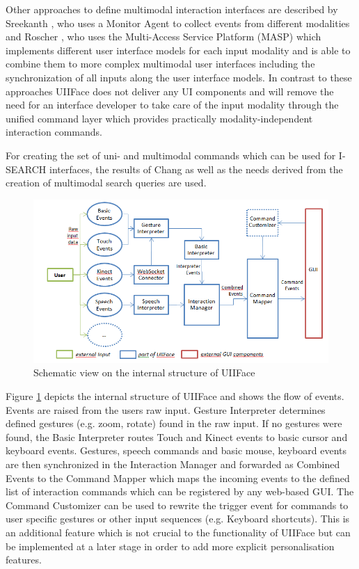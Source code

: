 \documentclass[runningheads,a4paper]{llncs} \usepackage[utf8]{inputenc}
\begin{document}
Other approaches to define multimodal interaction interfaces are described by
Sreekanth \cite{sreekanth}, who uses a Monitor Agent to collect events from
different modalities and Roscher \cite{roscher}, who uses the Multi-Access
Service Platform (MASP) which implements different user interface models for
each input modality and is able to combine them to more complex multimodal user
interfaces including the synchronization of all inputs along the user interface
models. In contrast to these approaches UIIFace does not deliver any UI
components and will remove the need for an interface developer to take care of
the input modality through the unified command layer which provides practically
modality-independent interaction commands.

For creating the set of uni- and multimodal commands which can be used for
I-SEARCH interfaces, the results of Chang \cite{chang} as well as the needs
derived from the creation of multimodal search queries are used.

\begin{figure}[h!]
  \centering
    \includegraphics[width=0.8\linewidth]{resources/uiiface-structure.png}
  \caption{Schematic view on the internal structure of UIIFace}
  \label{fig:uiiface}
\end{figure}

Figure \ref{fig:uiiface} depicts the internal structure of UIIFace and shows the
flow of events. Events are raised from the users raw input. Gesture Interpreter
determines defined gestures (e.g. zoom, rotate) found in the raw input. If no
gestures were found, the Basic Interpreter routes Touch and Kinect events to
basic cursor and keyboard events. Gestures, speech commands and basic mouse,
keyboard events are then synchronized in the Interaction Manager and forwarded
as Combined Events to the Command Mapper which maps the incoming events to the
defined list of interaction commands which can be registered by any web-based
GUI. The Command Customizer can be used to rewrite the trigger event for
commands to user specific gestures or other input sequences (e.g. Keyboard
shortcuts). This is an additional feature which is not crucial to the
functionality of UIIFace but can be implemented at a later stage in order to add
more explicit personalisation features.
\end{document}
